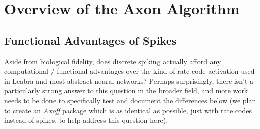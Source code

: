 \documentclass[11pt,twoside]{article}
\newif\myifpdf
\begin{document}
\section{Overview of the Axon Algorithm}

\subsection{Functional Advantages of Spikes}

Aside from biological fidelity, does discrete spiking actually afford any computational / functional advantages over the kind of rate code activation used in Leabra and most abstract neural networks? Perhaps surprisingly, there isn't a particularly strong answer to this question in the broader field, and more work needs to be done to specifically test and document the differences below (we plan to create an \emph{Axoff} package which is as identical as possible, just with rate codes instead of spikes, to help address this question here).
\end{document}

